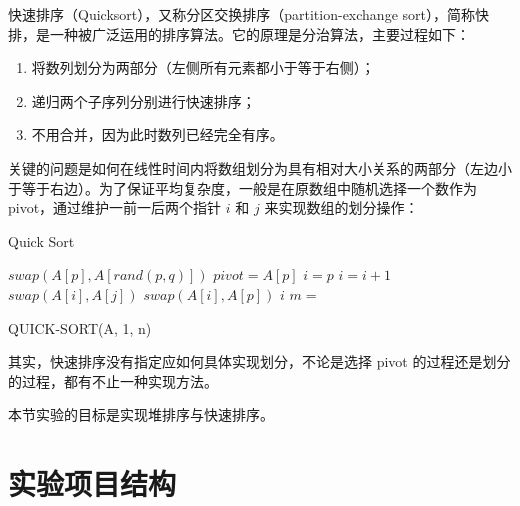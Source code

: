 \documentclass[12pt,a4paper]{article}
\begin{document}
快速排序（Quicksort），又称分区交换排序（partition-exchange sort），简称快排，是一种被广泛运用的排序算法。它的原理是分治算法，主要过程如下：

\begin{enumerate}[noitemsep]
    \item 将数列划分为两部分（左侧所有元素都小于等于右侧）；
    \item 递归两个子序列分别进行快速排序；
    \item 不用合并，因为此时数列已经完全有序。
\end{enumerate}

关键的问题是如何在线性时间内将数组划分为具有相对大小关系的两部分（左边小于等于右边）。为了保证平均复杂度，一般是在原数组中随机选择一个数作为 pivot，通过维护一前一后两个指针 $i$ 和 $j$ 来实现数组的划分操作：

\begin{algorithm}[h]
    \caption{Quick Sort}
    \begin{algorithmic}[1]
        \State $swap(A[p], A[rand(p, q)])$ 
        \State $pivot = A[p]$
        \State $i = p$
        \State $i = i + 1$
        \State $swap(A[i], A[j])$
        \EndIf
        \EndFor
        \State $swap(A[i], A[p])$
        \State \Return $i$
        \EndFunction
        \State $m = $ 
        \State {}
        \State {}
        \EndIf

        \EndFunction

        \State QUICK-SORT(A, 1, n) 
    \end{algorithmic}
\end{algorithm}

其实，快速排序没有指定应如何具体实现划分，不论是选择 pivot 的过程还是划分的过程，都有不止一种实现方法。

本节实验的目标是实现堆排序与快速排序。


\newpage

\section{实验项目结构}
\end{document}
